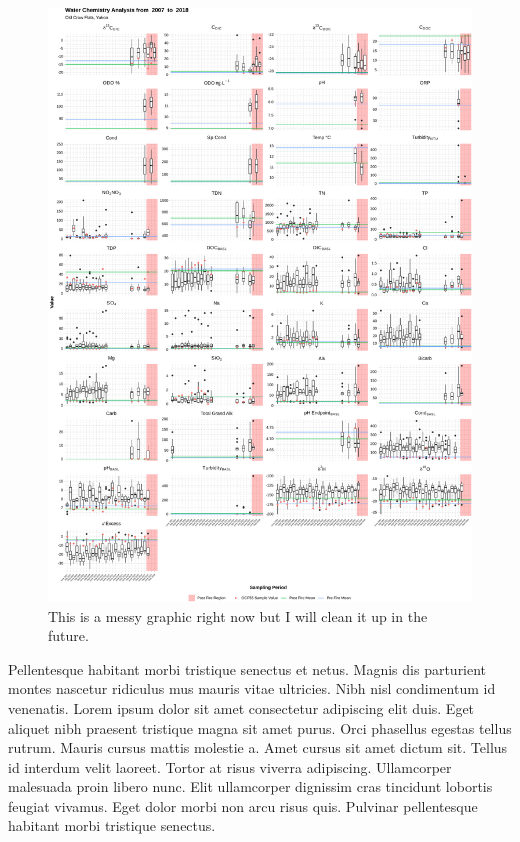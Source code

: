 \documentclass[article,30pt,extrafontsizes]{memoir}
\begin{document}
\begin{multicols*}{3}
{\begin{figure}
{\centering \includegraphics[width=0.8\linewidth]{Figures/figure2} 

}

\caption{This is a messy graphic right now but I will clean it up in the future.}\label{fig:unnamed-chunk-4}
\end{figure}

Pellentesque habitant morbi tristique senectus et netus. Magnis dis
parturient montes nascetur ridiculus mus mauris vitae ultricies. Nibh
nisl condimentum id venenatis. Lorem ipsum dolor sit amet consectetur
adipiscing elit duis. Eget aliquet nibh praesent tristique magna sit
amet purus. Orci phasellus egestas tellus rutrum. Mauris cursus mattis
molestie a. Amet cursus sit amet dictum sit. Tellus id interdum velit
laoreet. Tortor at risus viverra adipiscing. Ullamcorper malesuada proin
libero nunc. Elit ullamcorper dignissim cras tincidunt lobortis feugiat
vivamus. Eget dolor morbi non arcu risus quis. Pulvinar pellentesque
habitant morbi tristique senectus.

\begin{figure}


\end{figure}}
\end{multicols*}
\end{document}
